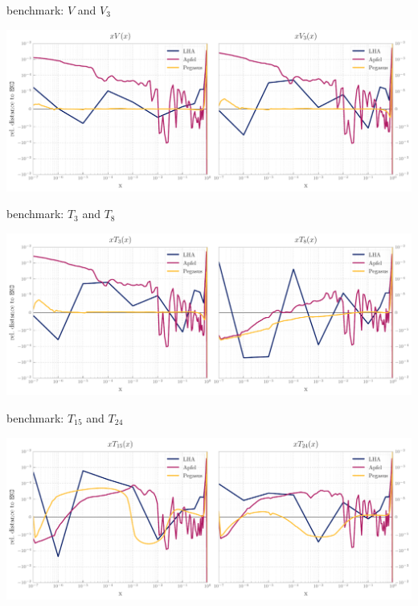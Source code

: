 \documentclass[9pt]{beamer}
\begin{document}
\begin{frame}{\eko{} \lha{} benchmark: $V$ and $V_3$}
	\begin{center}
		\includegraphics[width=\linewidth]{lha_bench_V_V3.pdf}
	\end{center}
\end{frame}
\begin{frame}{\eko{} \lha{} benchmark: $T_3$ and $T_8$}
	\begin{center}
		\includegraphics[width=\linewidth]{lha_bench_T3_T8.pdf}
	\end{center}
\end{frame}
\begin{frame}{\eko{} \lha{} benchmark: $T_{15}$ and $T_{24}$}
	\begin{center}
		\includegraphics[width=\linewidth]{lha_bench_T15_T24.pdf}
	\end{center}
\end{frame}
\end{document}
